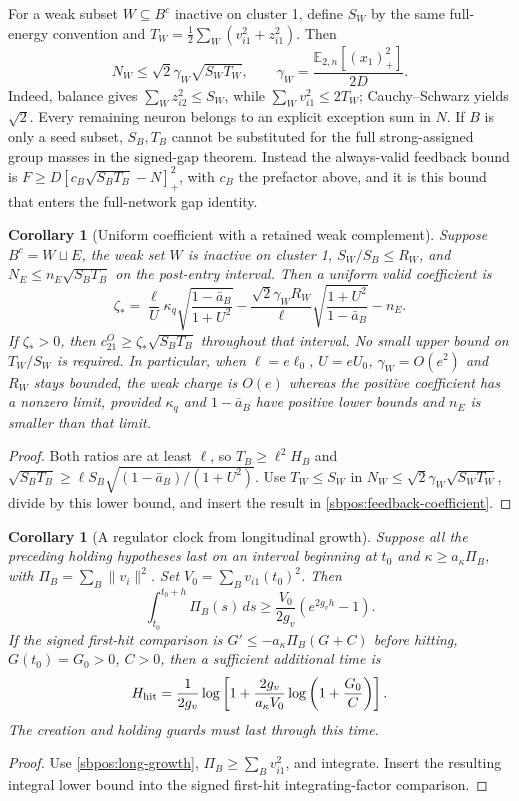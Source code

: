 \documentclass{article} %
\theoremstyle{plain}
\newtheorem{corollary}[theorem]{Corollary}
\theoremstyle{definition}
\theoremstyle{remark}
\begin{document}
For a weak subset $W\subseteq B^c$ inactive on cluster 1, define
$S_W$ by the same full-energy convention and
$T_W=\frac12\sum_W(v_{i1}^2+z_{i1}^2)$. Then
\[
 N_W\le\sqrt{2}\gamma_W\sqrt{S_WT_W},\qquad
 \gamma_W=\frac{\mathbb E_{2,n}[(x_1)_+^2]}{2D}.
\]
Indeed, balance gives $\sum_Wz_{i2}^2\le S_W$, while
$\sum_Wv_{i1}^2\le2T_W$; Cauchy--Schwarz yields $\sqrt{2}$.
Every remaining neuron belongs to an explicit exception sum in $N$.
If $B$ is only a seed subset, $S_B,T_B$ cannot be substituted for the full
strong-assigned group masses in the signed-gap theorem. Instead the
always-valid feedback bound is
$F\ge D[c_B\sqrt{S_BT_B}-N]_+^2$, with $c_B$ the prefactor above,
and it is this bound that enters the full-network gap identity.

\begin{corollary}[Uniform coefficient with a retained weak complement]
\label{sbpos:uniform-feedback}
Suppose $B^c=W\sqcup E$, the weak set $W$ is inactive on cluster 1,
$S_W/S_B\le R_W$, and
$N_E\le n_E\sqrt{S_BT_B}$ on the post-entry interval.
Then a uniform valid coefficient is
\begin{equation}\label{sbpos:zeta-uniform}
 \zeta_*=
 \frac{\ell}{U}\kappa_q\sqrt{\frac{1-\bar a_B}{1+U^2}}
 -\frac{\sqrt{2}\gamma_W R_W}{\ell}
               \sqrt{\frac{1+U^2}{1-\bar a_B}}-n_E.
\end{equation}
If $\zeta_*>0$, then $c_{21}^O\ge\zeta_*\sqrt{S_BT_B}$ throughout
that interval. No small upper bound on $T_W/S_W$ is required.
In particular, when $\ell=e\ell_0$, $U=eU_0$,
$\gamma_W=O(e^2)$ and $R_W$ stays bounded, the weak charge is $O(e)$
whereas the positive coefficient has a nonzero limit, provided
$\kappa_q$ and $1-\bar a_B$ have positive lower bounds and $n_E$ is
smaller than that limit.
\end{corollary}
\begin{proof}
Both ratios are at least $\ell$, so
$T_B\ge\ell^2 H_B$ and
$\sqrt{S_BT_B}\ge\ell S_B\sqrt{(1-\bar a_B)/(1+U^2)}$.
Use $T_W\le S_W$ in $N_W\le\sqrt{2}\gamma_W\sqrt{S_WT_W}$, divide by this
lower bound, and insert the result in \eqref{sbpos:feedback-coefficient}.
\end{proof}

\begin{corollary}[A regulator clock from longitudinal growth]
\label{sbpos:clock}
Suppose all the preceding holding hypotheses last on an interval beginning
at $t_0$ and $\kappa\ge a_\kappa\Pi_B$, with
$\Pi_B=\sum_B\|v_i\|^2$. Set $V_0=\sum_Bv_{i1}(t_0)^2$.
Then
\[
 \int_{t_0}^{t_0+h}\Pi_B(s)\,ds
 \ge \frac{V_0}{2g_v}(e^{2g_vh}-1).
\]
If the signed first-hit comparison is
$G'\le-a_\kappa\Pi_B(G+C)$ before hitting, $G(t_0)=G_0>0$, $C>0$,
then a sufficient additional time is
\[
 H_{\rm hit}=\frac1{2g_v}
 \log\left[1+\frac{2g_v}{a_\kappa V_0}
                   \log\left(1+\frac{G_0}{C}\right)\right].
\]
The creation and holding guards must last through this time.
\end{corollary}
\begin{proof}
Use \eqref{sbpos:long-growth}, $\Pi_B\ge\sum_Bv_{i1}^2$, and integrate.
Insert the resulting integral lower bound into the signed first-hit
integrating-factor comparison.
\end{proof}
\end{document}
